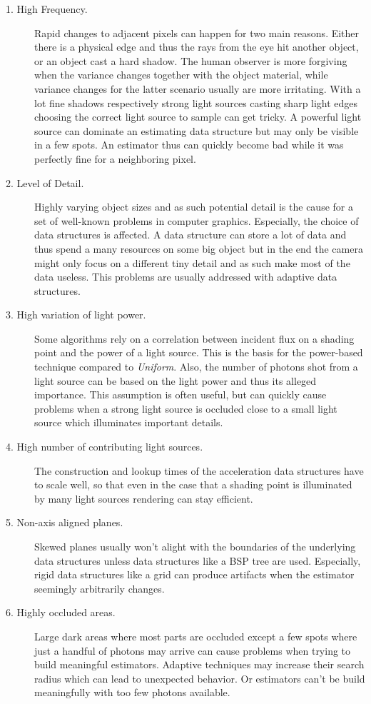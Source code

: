 \begin{description}
    \item[1. High Frequency.] Rapid changes to adjacent pixels can happen for two main reasons. Either there is a physical edge and thus the rays from the eye hit another object, or an object cast a hard shadow. The human observer is more forgiving when the variance changes together with the object material, while variance changes for the latter scenario usually are more irritating. With a lot fine shadows respectively strong light sources casting sharp light edges choosing the correct light source to sample can get tricky. A powerful light source can dominate an estimating data structure but may only be visible in a few spots. An estimator thus can quickly become bad while it was perfectly fine for a neighboring pixel. 
    \item[2. Level of Detail.] Highly varying object sizes and as such potential detail is the cause for a set of well-known problems in computer graphics. Especially, the choice of data structures is affected. A data structure can store a lot of data and thus spend a many resources on some big object but in the end the camera might only focus on a different tiny detail and as such make most of the data useless. This problems are usually addressed with adaptive data structures.
    \item[3. High variation of light power.] Some algorithms rely on a correlation between incident flux on a shading point and the power of a light source. This is the basis for the power-based technique compared to \textit{Uniform}. Also, the number of photons shot from a light source can be based on the light power and thus its alleged importance. This assumption is often useful, but can quickly cause problems when a strong light source is occluded close to a small light source which illuminates important details.
    \item[4. High number of contributing light sources.] The construction and lookup times of the acceleration data structures have to scale well, so that even in the case that a shading point is illuminated by many light sources rendering can stay efficient.
    \item[5. Non-axis aligned planes.] Skewed planes usually won't alight with the boundaries of the underlying data structures unless data structures like a BSP tree are used. Especially, rigid data structures like a grid can produce artifacts when the estimator seemingly arbitrarily changes. 
    \item[6. Highly occluded areas.] Large dark areas where most parts are occluded except a few spots where just a handful of photons may arrive can cause problems when trying to build meaningful estimators. Adaptive techniques may increase their search radius which can lead to unexpected behavior. Or estimators can't be build meaningfully with too few photons available.

\end{description}
